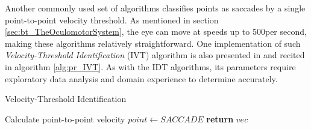 Another commonly used set of algorithms classifies points as saccades by a single point-to-point velocity threshold. As mentioned in section \ref{sec:bt_TheOculomotorSystem}, the eye can move at speeds up to 500\degree per second, making these algorithms relatively straightforward. One implementation of such \textit{Velocity-Threshold Identification} (IVT) algorithm is also presented in \cite{salvucci2000} and recited in algorithm \ref{alg:pr_IVT}. As with the IDT algorithms, its parameters require exploratory data analysis and domain experience to determine accurately. 

\begin{algorithm}
    \caption{Velocity-Threshold Identification}
    \label{alg:pr_IVT}
    \begin{algorithmic}[1]
                \State Calculate point-to-point velocity
            \EndFor
                    \State $point \gets SACCADE$
                \EndIf
            \EndFor
            \State \textbf{return} $vec$
        \EndProcedure
    \end{algorithmic}
\end{algorithm}

